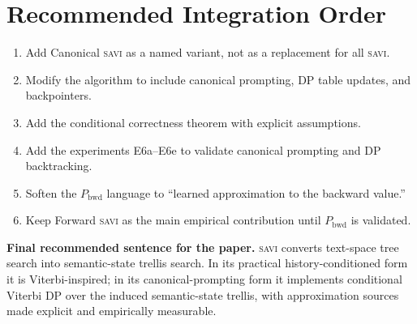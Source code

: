 \documentclass[11pt,letterpaper]{article}
\newcommand{\Pbwd}{P_{\mathrm{bwd}}}
\newcommand{\SAVI}{\textsc{savi}\xspace}
\begin{document}
\section{Recommended Integration Order}

\begin{enumerate}
  \item Add Canonical \SAVI as a named variant, not as a replacement for all \SAVI.
  \item Modify the algorithm to include canonical prompting, DP table updates, and backpointers.
  \item Add the conditional correctness theorem with explicit assumptions.
  \item Add the experiments E6a--E6e to validate canonical prompting and DP backtracking.
  \item Soften the $\Pbwd$ language to ``learned approximation to the backward value.''
  \item Keep Forward \SAVI as the main empirical contribution until $\Pbwd$ is validated.
\end{enumerate}

\begin{callout}
\textbf{Final recommended sentence for the paper.}
\SAVI converts text-space tree search into semantic-state trellis search.
In its practical history-conditioned form it is Viterbi-inspired;
in its canonical-prompting form it implements conditional Viterbi DP over the induced
semantic-state trellis, with approximation sources made explicit and empirically measurable.
\end{callout}
\end{document}
